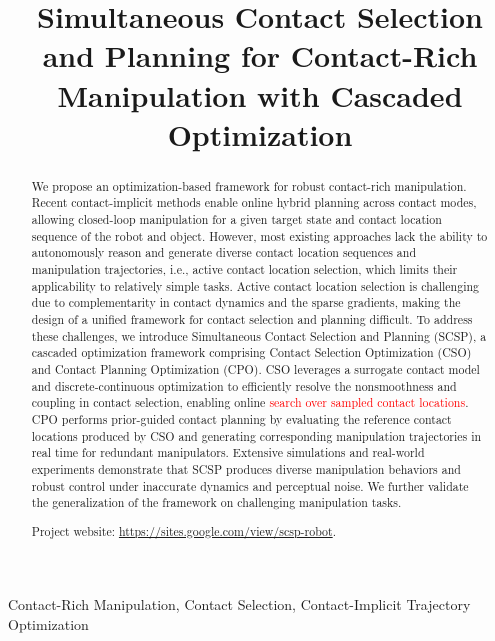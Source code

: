 \documentclass[journal]{IEEEtran}
\theoremstyle{definition}
\newcommand{\rev}[1]{\textcolor{red}{#1}}
\begin{document}
\title{Simultaneous Contact Selection and Planning for Contact-Rich Manipulation with Cascaded Optimization}


\maketitle

\begin{abstract}
We propose an optimization-based framework for robust contact-rich manipulation. Recent contact-implicit methods enable online hybrid planning across contact modes, allowing closed-loop manipulation for a given target state and contact location sequence of the robot and object. However, most existing approaches lack the ability to autonomously reason and generate diverse contact location sequences and manipulation trajectories, i.e., active contact location selection, which limits their applicability to relatively simple tasks. Active contact location selection is challenging due to complementarity in contact dynamics and the sparse gradients, making the design of a unified framework for contact selection and planning difficult. To address these challenges, we introduce Simultaneous Contact Selection and Planning (SCSP), a cascaded optimization framework comprising Contact Selection Optimization (CSO) and Contact Planning Optimization (CPO). CSO leverages a surrogate contact model and discrete-continuous optimization to efficiently resolve the nonsmoothness and coupling in contact selection, enabling online \rev{search over sampled contact locations}. CPO performs prior-guided contact planning by evaluating the reference contact locations produced by CSO and generating corresponding manipulation trajectories in real time for redundant manipulators. Extensive simulations and real-world experiments demonstrate that SCSP produces diverse manipulation behaviors and robust control under inaccurate dynamics and perceptual noise. We further validate the generalization of the framework on challenging manipulation tasks.

Project website: \href{https://sites.google.com/view/scsp-robot}{https://sites.google.com/view/scsp-robot}.
\end{abstract}

\begin{IEEEkeywords}
Contact-Rich Manipulation, Contact Selection, Contact-Implicit Trajectory Optimization
\end{IEEEkeywords}
\end{document}
